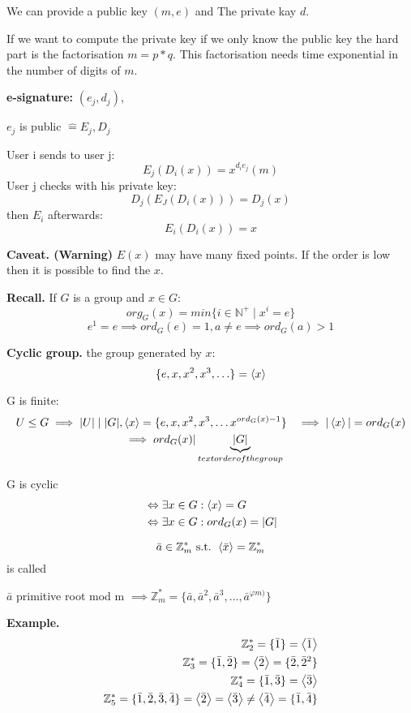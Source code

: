 We can provide a public key $(m,e)$ and The private kay $d$.

If we want to compute the private key if we only know the public key the hard part is the factorisation $m = p*q$. This factorisation needs time exponential in the number of digits of $m$.

\textbf{e-signature: } 
$(e_j,d_j)$,

$e_j$ is public $\hat{=} E_j, D_j$

User i sends to user j:
\[
  E_j(D_i(x)) = x^{d_i e_j} (m)
\]
User j checks with his private key:
\[
  D_j (E_J(D_i(x))) = D_j(x)
\]
then $E_i$ afterwards:
\[
  E_i(D_i(x)) = x
\]

\textbf{Caveat. (Warning)}
$E(x)$ may have many fixed points. 
If the order is low then it is possible to find the $x$. 

\textbf{Recall.}
If $G$ is a group and $x\in G$:
\[
  org_G(x) = min\{ i\in \mathbb{N}^{+} \mid x^i = e \}
\]
\[
  e^1 = e \implies ord_G(e) = 1, a \neq e \implies ord_G(a) > 1
\]

\textbf{Cyclic group.}
the group generated by $x$:
\[
  \{ e, x, x^2, x^3, \ldots \} = \left\langle x \right\rangle
\]

G is finite:
\begin{align*}
  U \leq  G \implies |U| \mid |G|, 
  & \left\langle x \right\rangle = \{ e, x, x^2, x^3, \ldots x^{ord_G(x) -1}\}
    &\implies |\left\langle x \right\rangle| = ord_G(x) \\
    &\implies ord_G(x) | \underbrace{|G|}_{text{order of the group}} \\
\end{align*}

G is cyclic
\begin{align*}
  & \Leftrightarrow \exists x \in G: \left\langle x \right\rangle = G \\
  & \Leftrightarrow \exists x \in G: ord_G(x) = |G|
\end{align*}

\begin{definition}
  \[
    \bar{a} \in \mathbb{Z}_m^{*} \text{ s.t. } \left\langle \bar{x} \right\rangle = \mathbb{Z}_m^{*} 
\]
is called 

$\bar{a}$ primitive root mod m 
$\implies \mathbb{Z}_m^{*} = \{\bar{a}, \bar{a}^2, \bar{a}^3, \ldots, \bar{a}^{\varphi{m)}} \}$
\end{definition}

\textbf{Example.}
\begin{align*}
  \mathbb{Z}_2^{*} = \{\bar{1}\} = \left\langle \bar{1} \right\rangle \\
  \mathbb{Z}_3^{*} = \{\bar{1}, \bar{2}\} = \left\langle \bar{2} \right\rangle 
    = \{\bar{2}, \bar{2}^2 \}\\
  \mathbb{Z}_4^{*} = \{\bar{1}, \bar{3}\} = \left\langle \bar{3} \right\rangle \\
  \mathbb{Z}_5^{*} = \{\bar{1}, \bar{2}, \bar{3}, \bar{4}\} 
    = \left\langle \bar{2} \right\rangle = \left\langle \bar{3} \right\rangle \neq \left\langle \bar{4} \right\rangle
    = \{\bar{1}, \bar{4}\} \\
\end{align*}

